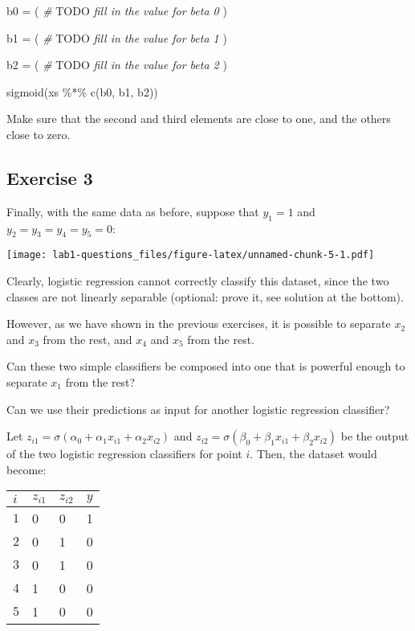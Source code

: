 \documentclass[
]{article}
\newenvironment{Shaded}{\begin{snugshade}}{\end{snugshade}}
\newcommand{\AlertTok}[1]{\textcolor[rgb]{0.94,0.16,0.16}{#1}}
\newcommand{\CommentTok}[1]{\textcolor[rgb]{0.56,0.35,0.01}{\textit{#1}}}
\newcommand{\FunctionTok}[1]{\textcolor[rgb]{0.00,0.00,0.00}{#1}}
\newcommand{\NormalTok}[1]{#1}
\newcommand{\OtherTok}[1]{\textcolor[rgb]{0.56,0.35,0.01}{#1}}
\newcommand{\SpecialCharTok}[1]{\textcolor[rgb]{0.00,0.00,0.00}{#1}}
\begin{document}
\begin{Shaded}
\begin{Highlighting}[]
\NormalTok{b0 }\OtherTok{=}\NormalTok{ (}
  \CommentTok{\# }\AlertTok{TODO}\CommentTok{ fill in the value for beta 0}
\NormalTok{)}

\NormalTok{b1 }\OtherTok{=}\NormalTok{ (}
  \CommentTok{\# }\AlertTok{TODO}\CommentTok{ fill in the value for beta 1}
\NormalTok{)}

\NormalTok{b2 }\OtherTok{=}\NormalTok{ (}
  \CommentTok{\# }\AlertTok{TODO}\CommentTok{ fill in the value for beta 2}
\NormalTok{)}

\FunctionTok{sigmoid}\NormalTok{(xs }\SpecialCharTok{\%*\%} \FunctionTok{c}\NormalTok{(b0, b1, b2))}
\end{Highlighting}
\end{Shaded}

Make sure that the second and third elements are close to one, and the
others close to zero.

\hypertarget{exercise-3}{%
\subsection{Exercise 3}\label{exercise-3}}

Finally, with the same data as before, suppose that \(y_1=1\) and
\(y_2=y_3=y_4=y_5=0\):

\texttt{[image: lab1-questions\_files/figure-latex/unnamed-chunk-5-1.pdf]}

Clearly, logistic regression cannot correctly classify this dataset,
since the two classes are not linearly separable (optional: prove it,
see solution at the bottom).

However, as we have shown in the previous exercises, it is possible to
separate \(x_2\) and \(x_3\) from the rest, and \(x_4\) and \(x_5\) from
the rest.

Can these two simple classifiers be composed into one that is powerful
enough to separate \(x_1\) from the rest?

Can we use their predictions as input for another logistic regression
classifier?

Let \(z_{i1}=\sigma(\alpha_0+\alpha_1x_{i1}+\alpha_2x_{i2})\) and
\(z_{i2}=\sigma(\beta_0+\beta_1x_{i1}+\beta_2x_{i2})\) be the output of
the two logistic regression classifiers for point \(i\). Then, the
dataset would become:

\begin{longtable}[]{@{}llll@{}}
\toprule
\(i\) & \(z_{i1}\) & \(z_{i2}\) & \(y\)\tabularnewline
\midrule
\endhead
\(1\) & 0 & 0 & 1\tabularnewline
\(2\) & 0 & 1 & 0\tabularnewline
\(3\) & 0 & 1 & 0\tabularnewline
\(4\) & 1 & 0 & 0\tabularnewline
\(5\) & 1 & 0 & 0\tabularnewline
\bottomrule
\end{longtable}
\end{document}
